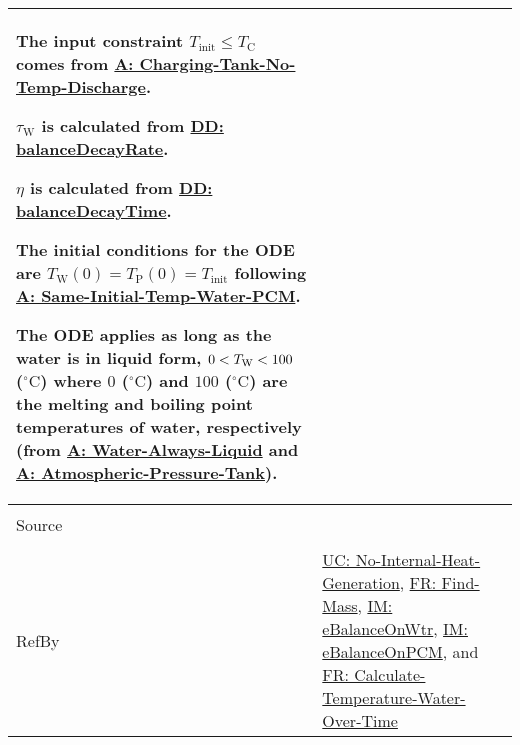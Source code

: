 \documentclass[12pt]{article}
\newcommand{\lt}{\ensuremath <}
\begin{document}
\begin{minipage}{\textwidth}
\begin{tabular}{>{\raggedright}p{}>{\raggedright\arraybackslash}p{}}
        The input constraint ${T_{\text{init}}}\leq{}{T_{\text{C}}}$ comes from \hyperref[assumpCTNOD]{A: Charging-Tank-No-Temp-Discharge}.
        
        ${τ_{\text{W}}}$ is calculated from \hyperref[DD:balanceDecayRate]{DD: balanceDecayRate}.
        
        $η$ is calculated from \hyperref[DD:balanceDecayTime]{DD: balanceDecayTime}.
        
        The initial conditions for the ODE are ${T_{\text{W}}}\left(0\right)={T_{\text{P}}}\left(0\right)={T_{\text{init}}}$ following \hyperref[assumpSITWP]{A: Same-Initial-Temp-Water-PCM}.
        
        The ODE applies as long as the water is in liquid form, $0\lt{}{T_{\text{W}}}\lt{}100$ (${{}^{\circ}\text{C}}$) where $0$ (${{}^{\circ}\text{C}}$) and $100$ (${{}^{\circ}\text{C}}$) are the melting and boiling point temperatures of water, respectively (from \hyperref[assumpWAL]{A: Water-Always-Liquid} and \hyperref[assumpAPT]{A: Atmospheric-Pressure-Tank}).
        
\\ \midrule \\
Source & \cite{koothoor2013}
         
\\ \midrule \\
RefBy & \hyperref[unlikeChgNIHG]{UC: No-Internal-Heat-Generation}, \hyperref[findMass]{FR: Find-Mass}, \hyperref[IM:eBalanceOnWtr]{IM: eBalanceOnWtr}, \hyperref[IM:eBalanceOnPCM]{IM: eBalanceOnPCM}, and \hyperref[calcTempWtrOverTime]{FR: Calculate-Temperature-Water-Over-Time}
        
\\ \bottomrule
\end{tabular}
\end{minipage}
\end{document}
